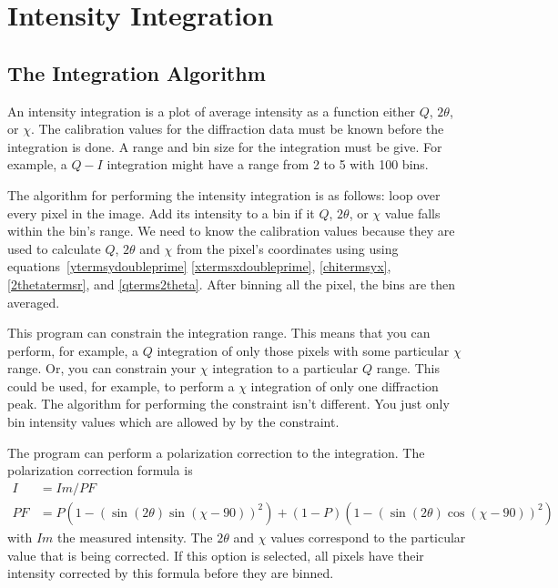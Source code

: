 \chapter{Intensity Integration}

\section{The Integration Algorithm}\label{integration_algorithm}

An intensity integration is a plot of average intensity as 
a function either $Q$, $2\theta$, or $\chi$. The calibration 
values for the diffraction data must be known before 
the integration is done. A range and bin size for the
integration must be give. For example, a $Q-I$ integration 
might have a range from 2 to 5 with 100 bins. 

The algorithm for performing the intensity integration
is as follows: loop over every pixel in the image. 
Add its intensity to a bin if it $Q$, $2\theta$, 
or $\chi$ value falls within the bin's range.
We need to know the calibration values because
they are used to calculate $Q$, $2\theta$ and $\chi$
from the pixel's coordinates using 
using equations~\ref{ytermsydoubleprime}
\ref{xtermsxdoubleprime}, \ref{chitermsyx}, 
\ref{2thetatermsr}, and \ref{qterms2theta}.
After binning all the pixel, the bins are then averaged.

This program can constrain the integration range. 
This means that you can perform, for example,
a $Q$ integration of only those pixels with some
particular $\chi$ range. Or, you can
constrain your $\chi$ integration to a particular
$Q$ range. This could be used, for example, to
perform a $\chi$ integration of only one
diffraction peak. The algorithm for performing
the constraint isn't different. You just
only bin intensity values which are allowed by 
by the constraint.

The program can perform a polarization 
correction to the integration. The polarization 
correction formula is
\begin{align}
    I&=Im/PF \\ 
    PF&=P(1 - (\sin(2\theta)\sin(\chi-90))^2) + 
    (1 - P)(1 - (\sin(2\theta)\cos(\chi-90))^2)
\end{align}
with $Im$ the measured intensity.  The $2\theta$ 
and $\chi$ values correspond to the particular 
value that is being corrected. If this option
is selected, all pixels have their intensity
corrected by this formula before they
are binned. 

